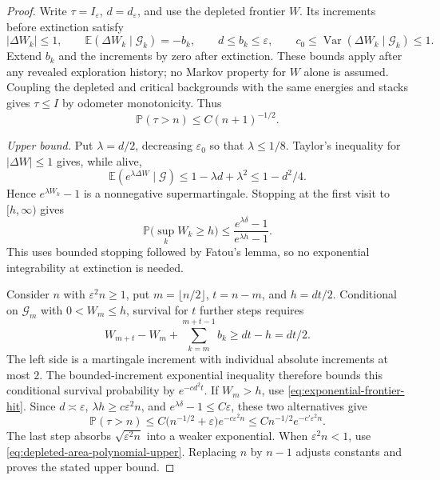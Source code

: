 \documentclass[11pt]{article}
\numberwithin{equation}{section}
\theoremstyle{definition}
\newcommand{\E}{\mathbb E}
\newcommand{\Prob}{\mathbb P}
\newcommand{\Var}{\operatorname{Var}}
\begin{document}
\begin{proof}
Write $\tau=I_\varepsilon$, $d=d_\varepsilon$, and use the depleted frontier $W$. Its increments before extinction satisfy
\[
 |\Delta W_k|\le1,\qquad
 \E(\Delta W_k\mid\mathcal G_k)=-b_k,\qquad
 d\le b_k\le\varepsilon,\qquad
 c_0\le\Var(\Delta W_k\mid\mathcal G_k)\le1.
\]
Extend $b_k$ and the increments by zero after extinction. These bounds apply after any revealed exploration history; no Markov property for $W$ alone is assumed. Coupling the depleted and critical backgrounds with the same energies and stacks gives $\tau\le I$ by odometer monotonicity. Thus
\begin{equation}\label{eq:depleted-area-polynomial-upper}
 \Prob(\tau>n)\le C(n+1)^{-1/2}.
\end{equation}

\emph{Upper bound.} Put $\lambda=d/2$, decreasing $\varepsilon_0$ so that $\lambda\le1/8$. Taylor's inequality for $|\Delta W|\le1$ gives, while alive,
\[
 \E(e^{\lambda\Delta W}\mid\mathcal G)
 \le1-\lambda d+\lambda^2\le1-d^2/4.
\]
Hence $e^{\lambda W_k}-1$ is a nonnegative supermartingale. Stopping at the first visit to $[h,\infty)$ gives
\begin{equation}\label{eq:exponential-frontier-hit}
 \Prob\bigl(\sup_k W_k\ge h\bigr)
 \le\frac{e^{\lambda\delta}-1}{e^{\lambda h}-1}.
\end{equation}
This uses bounded stopping followed by Fatou's lemma, so no exponential integrability at extinction is needed.

Consider $n$ with $\varepsilon^2n\ge1$, put $m=\lfloor n/2\rfloor$, $t=n-m$, and $h=dt/2$. Conditional on $\mathcal G_m$ with $0<W_m\le h$, survival for $t$ further steps requires
\[
 W_{m+t}-W_m+\sum_{k=m}^{m+t-1}b_k\ge dt-h=dt/2.
\]
The left side is a martingale increment with individual absolute increments at most $2$. The bounded-increment exponential inequality therefore bounds this conditional survival probability by $e^{-c d^2t}$. If $W_m>h$, use \eqref{eq:exponential-frontier-hit}. Since $d\asymp\varepsilon$, $\lambda h\ge c\varepsilon^2n$, and $e^{\lambda\delta}-1\le C\varepsilon$, these two alternatives give
\[
 \Prob(\tau>n)
 \le C\bigl(n^{-1/2}+\varepsilon\bigr)e^{-c\varepsilon^2n}
 \le C n^{-1/2}e^{-c'\varepsilon^2n}.
\]
The last step absorbs $\sqrt{\varepsilon^2n}$ into a weaker exponential. When $\varepsilon^2n<1$, use \eqref{eq:depleted-area-polynomial-upper}. Replacing $n$ by $n-1$ adjusts constants and proves the stated upper bound.


\end{proof}
\end{document}
